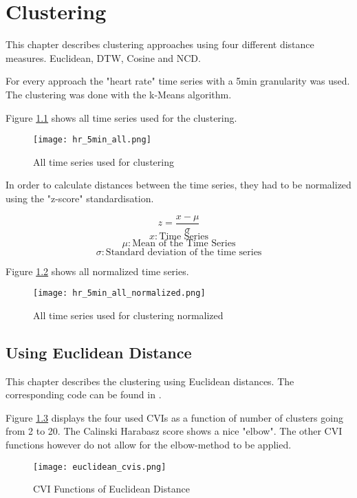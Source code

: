 \chapter{Clustering}

This chapter describes clustering approaches using four different distance measures. Euclidean, DTW, Cosine and NCD.

For every approach the "heart rate" time series with a 5min granularity was used. The clustering was done with the k-Means algorithm.

Figure \ref{fig:all_ts_clust} shows all time series used for the clustering.



\begin{figure}[h!]
	\texttt{[image: hr\_5min\_all.png]}
	\caption{All time series used for clustering}
	\label{fig:all_ts_clust}
\end{figure}

In order to calculate distances between the time series, they had to be normalized using the "z-score" standardisation.

$$ z = \frac{x - \mu}{\sigma} $$
$$ x : \text{Time Series} $$
$$ \mu: \text{Mean of the Time Series} $$
$$ \sigma: \text{Standard deviation of the time series} $$


Figure \ref{fig:all_ts_clust_normalized} shows all normalized time series.

\begin{figure}[h!]
	\texttt{[image: hr\_5min\_all\_normalized.png]}
	\caption{All time series used for clustering normalized}
	\label{fig:all_ts_clust_normalized}
\end{figure}



\clearpage
\section{Using Euclidean Distance}

This chapter describes the clustering using Euclidean distances. The corresponding code can be found in .


Figure \ref{fig:cvi_euc} displays the four used CVIs as a function of number of clusters going from 2 to 20. The Calinski Harabasz score shows a nice "elbow". The other CVI functions however do not allow for the elbow-method to be applied.

\begin{figure}[h!]
	\texttt{[image: euclidean\_cvis.png]}
	\caption{CVI Functions of Euclidean Distance}
	\label{fig:cvi_euc}
\end{figure}

